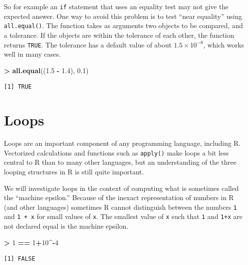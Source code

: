 \documentclass[]{krantz}
\makeatletter
\newenvironment{Shaded}{\begin{snugshade}}{\end{snugshade}}
\newcommand{\KeywordTok}[1]{\textcolor[rgb]{0.27,0.27,0.27}{\textbf{#1}}}
\newcommand{\DecValTok}[1]{\textcolor[rgb]{0.06,0.06,0.06}{#1}}
\newcommand{\FloatTok}[1]{\textcolor[rgb]{0.06,0.06,0.06}{#1}}
\newcommand{\StringTok}[1]{\textcolor[rgb]{0.5,0.5,0.5}{#1}}
\newcommand{\OperatorTok}[1]{\textcolor[rgb]{0.43,0.43,0.43}{\textbf{#1}}}
\newcommand{\NormalTok}[1]{#1}
\newenvironment{kframe}{%
\medskip{}
\setlength{\fboxsep}{.8em}
 \def\at@end@of@kframe{}%
 \ifinner\ifhmode%
  \def\at@end@of@kframe{\end{minipage}}%
  \begin{minipage}{\columnwidth}%
 \fi\fi%
 \def\FrameCommand##1{\hskip\@totalleftmargin \hskip-\fboxsep
 \colorbox{shadecolor}{##1}\hskip-\fboxsep
     \hskip-\linewidth \hskip-\@totalleftmargin \hskip\columnwidth}%
 \MakeFramed {\advance\hsize-\width
   \@totalleftmargin\z@ \linewidth\hsize
   \@setminipage}}%
 {\par\unskip\endMakeFramed%
 \at@end@of@kframe}
\renewenvironment{Shaded}{\begin{kframe}}{\end{kframe}}
\makeatother
\begin{document}
So for example an \texttt{if} statement that uses an equality test may
not give the expected answer. One way to avoid this problem is to test
``near equality'' using \texttt{all.equal()}. The function takes as
arguments two objects to be compared, and a tolerance. If the objects
are within the tolerance of each other, the function returns
\texttt{TRUE}. The tolerance has a default value of about
\(1.5\times 10^{-8}\), which works well in many cases.

\begin{Shaded}
\begin{Highlighting}[]
\OperatorTok{>}\StringTok{ }\KeywordTok{all.equal}\NormalTok{((}\FloatTok{1.5} \OperatorTok{-}\StringTok{ }\FloatTok{1.4}\NormalTok{), }\FloatTok{0.1}\NormalTok{)}
\end{Highlighting}
\end{Shaded}

\begin{verbatim}
[1] TRUE
\end{verbatim}

\section{Loops}\label{loops}

Loops are an important component of any programming language, including
R. Vectorized calculations and functions such as \texttt{apply()} make
loops a bit less central to R than to many other languages, but an
understanding of the three looping structures in R is still quite
important.

We will investigate loops in the context of computing what is sometimes
called the ``machine epsilon.'' Because of the inexact representation of
numbers in R (and other languages) sometimes R cannot distinguish
between the numbers \texttt{1} and \texttt{\textbar{}1\ +\ x\textbar{}}
for small values of \texttt{x}. The smallest value of \texttt{x} such
that \texttt{1} and \texttt{\textbar{}1+x\textbar{}} are not declared
equal is the machine epsilon.

\begin{Shaded}
\begin{Highlighting}[]
\OperatorTok{>}\StringTok{ }\DecValTok{1} \OperatorTok{==}\StringTok{ }\DecValTok{1}\OperatorTok{+}\DecValTok{10}\OperatorTok{^-}\DecValTok{4}
\end{Highlighting}
\end{Shaded}

\begin{verbatim}
[1] FALSE
\end{verbatim}
\end{document}
